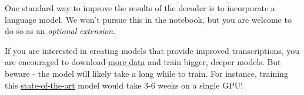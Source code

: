 \documentclass[11pt]{article}
\begin{document}
    One standard way to improve the results of the decoder is to incorporate
a language model. We won't pursue this in the notebook, but you are
welcome to do so as an \emph{optional extension}.

If you are interested in creating models that provide improved
transcriptions, you are encouraged to download
\href{http://www.openslr.org/12/}{more data} and train bigger, deeper
models. But beware - the model will likely take a long while to train.
For instance, training this
\href{https://arxiv.org/pdf/1512.02595v1.pdf}{state-of-the-art} model
would take 3-6 weeks on a single GPU!


    
    
    
    
\end{document}
